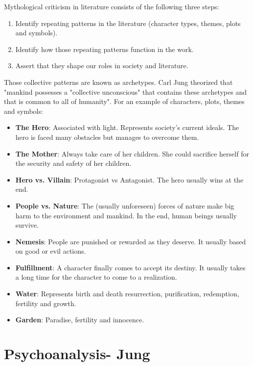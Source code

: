 \documentclass[11pt, twocolumn]{article}
\begin{document}
\begin{twocolumn}
Mythological criticism in literature consists of the following three steps:
\begin{enumerate}
        \item Identify repeating patterns in the literature (character types, themes, plots and symbols).
        \item Identify how those repeating patterns function in the work.
        \item Assert that they shape our roles in society and literature.
\end{enumerate}
Those collective patterns are known as archetypes. Carl Jung theorized that "mankind possesses a "collective unconscious" that contains these archetypes and that is common to all of humanity".
For an example of characters, plots, themes and symbols:
\begin{itemize}
        \item \textbf{The Hero}: Associated with light. Represents society’s current ideals. The hero is faced many obstacles but manages to overcome them.
        \item \textbf{The Mother}: Always take care of her children. She could sacrifice herself for the security and safety of her children.\\
        \item \textbf{Hero vs. Villain}: Protagonist vs Antagonist. The hero usually wins at the end.
        \item \textbf{People vs. Nature}: The (usually unforeseen) forces of nature make big harm to the environment and mankind. In the end, human beings usually survive.\\
        \item \textbf{Nemesis}: People are punished or rewarded as they deserve. It usually based on good or evil actions.
        \item \textbf{Fulfillment}: A character finally comes to accept its destiny. It usually takes a long time for the character to come to a realization.\\
        \item \textbf{Water}: Represents birth and death resurrection, purification, redemption, fertility and growth.
        \item \textbf{Garden}: Paradise, fertility and innocence.
\end{itemize}

\pagebreak
\section{Psychoanalysis- Jung}


\end{twocolumn}
\end{document}
